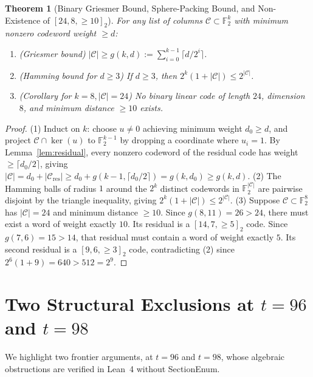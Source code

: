 \documentclass[11pt]{article}
\newtheorem{theorem}{Theorem}[section]
\theoremstyle{definition}
\newcommand{\F}{\mathbb{F}}
\newcommand{\code}[1]{{\ttfamily\small\renewcommand{\_}{\textunderscore\allowbreak}#1}}
\begin{document}
\begin{theorem}[Binary Griesmer Bound, Sphere-Packing Bound, and Non-Existence of {$[24, 8, \ge 10]_2$}]
\label{thm:code24}
For any list of columns $\mathcal{C} \subset \F_2^k$ with minimum nonzero codeword weight $\ge d$:
\begin{enumerate}[nosep]
  \item \emph{(Griesmer bound)} $|\mathcal{C}| \ge g(k, d) := \sum_{i=0}^{k-1} \lceil d / 2^i \rceil$.
  \item \emph{(Hamming bound for $d \ge 3$)} If $d \ge 3$, then $2^k (1 + |\mathcal{C}|) \le 2^{|\mathcal{C}|}$.
  \item \emph{(Corollary for $k = 8, |\mathcal{C}| = 24$)} No binary linear code of length $24$, dimension $8$, and minimum distance $\ge 10$ exists.
\end{enumerate}
\end{theorem}
\begin{proof}
(1) Induct on $k$: choose $u \neq 0$ achieving minimum weight $d_0 \ge d$, and project $\mathcal{C} \cap \ker(u)$ to $\F_2^{k-1}$ by dropping a coordinate where $u_i = 1$. By Lemma~\ref{lem:residual}, every nonzero codeword of the residual code has weight $\ge \lceil d_0 / 2 \rceil$, giving $|\mathcal{C}| = d_0 + |\mathcal{C}_{\mathrm{res}}| \ge d_0 + g(k-1, \lceil d_0/2\rceil) = g(k, d_0) \ge g(k, d)$.
(2) The Hamming balls of radius $1$ around the $2^k$ distinct codewords in $\F_2^{|\mathcal{C}|}$ are pairwise disjoint by the triangle inequality, giving $2^k(1 + |\mathcal{C}|) \le 2^{|\mathcal{C}|}$.
(3) Suppose $\mathcal{C} \subset \F_2^8$ has $|\mathcal{C}| = 24$ and minimum distance $\ge 10$. Since $g(8, 11) = 26 > 24$, there must exist a word of weight exactly $10$. Its residual is a $[14, 7, \ge 5]_2$ code. Since $g(7, 6) = 15 > 14$, that residual must contain a word of weight exactly $5$. Its second residual is a $[9, 6, \ge 3]_2$ code, contradicting (2) since $2^6(1 + 9) = 640 > 512 = 2^9$.
\end{proof}

\section{Two Structural Exclusions at $t = 96$ and $t = 98$}
\label{sec:t9698}

We highlight two frontier arguments, at $t = 96$ and $t = 98$, whose algebraic obstructions are verified in Lean~4 without \code{SectionEnum}.
\end{document}
